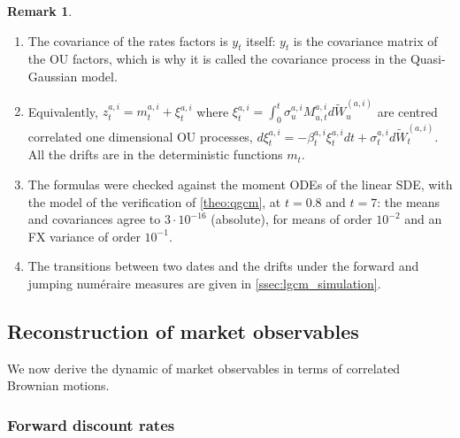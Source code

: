 \documentclass[11pt,english]{amsart}
\theoremstyle{definition}
\newtheorem{rema}{Remark}
\begin{document}
\begin{rema}
\begin{enumerate}
\item The covariance of the rates factors is $y_t$ itself: $y_t$ is the covariance matrix of the OU factors, which is why it is called the covariance process in the Quasi-Gaussian model.
\item Equivalently, $z^{a,i}_t = m^{a,i}_t + \xi^{a,i}_t$ where $\xi^{a,i}_t = \int_0^t\sigma^{a,i}_uM^{a,i}_{u,t}d\widetilde{W}^{(a,i)}_u$ are centred correlated one dimensional OU processes, $d\xi^{a,i}_t = -\beta^{a,i}_t\xi^{a,i}_tdt + \sigma^{a,i}_td\widetilde{W}^{(a,i)}_t$. All the drifts are in the deterministic functions $m_t$.
\item The formulas were checked against the moment ODEs of the linear SDE, with the model of the verification of \autoref{theo:qgcm}, at $t=0.8$ and $t=7$: the means and covariances agree to $3\cdot 10^{-16}$ (absolute), for means of order $10^{-2}$ and an FX variance of order $10^{-1}$.
\item The transitions between two dates and the drifts under the forward and jumping num\'eraire measures are given in \autoref{ssec:lgcm_simulation}.
\end{enumerate}
\end{rema}


\newpage%
\subsection{Reconstruction of market observables}
We now derive the dynamic of market observables in terms of correlated Brownian motions. 

\subsubsection{Forward discount rates}
\end{document}
